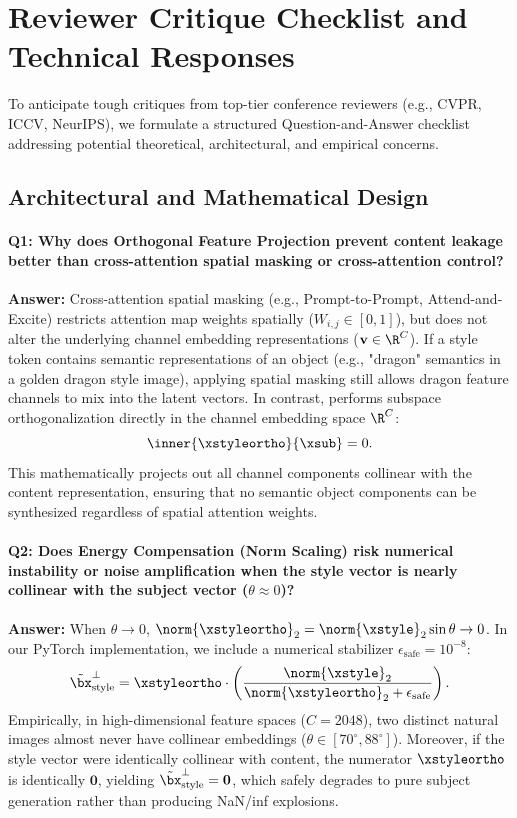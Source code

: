\section{Reviewer Critique Checklist and Technical Responses}
\label{sec:reviewer_checklist}

To anticipate tough critiques from top-tier conference reviewers (e.g., CVPR, ICCV, NeurIPS), we formulate a structured Question-and-Answer checklist addressing potential theoretical, architectural, and empirical concerns.

\subsection{Architectural and Mathematical Design}

\paragraph{Q1: Why does Orthogonal Feature Projection prevent content leakage better than cross-attention spatial masking or cross-attention control?}
\textbf{Answer:} Cross-attention spatial masking (e.g., Prompt-to-Prompt, Attend-and-Excite) restricts attention map weights spatially ($W_{i,j} \in [0, 1]$), but does not alter the underlying channel embedding representations ($\mathbf{v} \in \R^C$). If a style token contains semantic representations of an object (e.g., "dragon" semantics in a golden dragon style image), applying spatial masking still allows dragon feature channels to mix into the latent vectors. In contrast, \method performs subspace orthogonalization directly in the channel embedding space $\R^C$:
\begin{equation}
    \inner{\xstyleortho}{\xsub} = 0.
\end{equation}
This mathematically projects out all channel components collinear with the content representation, ensuring that no semantic object components can be synthesized regardless of spatial attention weights.

\paragraph{Q2: Does Energy Compensation (Norm Scaling) risk numerical instability or noise amplification when the style vector is nearly collinear with the subject vector ($\theta \approx 0$)?}
\textbf{Answer:} When $\theta \to 0$, $\norm{\xstyleortho}_2 = \norm{\xstyle}_2 \sin \theta \to 0$. In our PyTorch implementation, we include a numerical stabilizer $\epsilon_{\text{safe}} = 10^{-8}$:
\begin{equation}
    \tilde{\bx}_{\text{style}}^\perp = \xstyleortho \cdot \left( \frac{\norm{\xstyle}_2}{\norm{\xstyleortho}_2 + \epsilon_{\text{safe}}} \right).
\end{equation}
Empirically, in high-dimensional feature spaces ($C = 2048$), two distinct natural images almost never have collinear embeddings ($\theta \in [70^\circ, 88^\circ]$). Moreover, if the style vector were identically collinear with content, the numerator $\xstyleortho$ is identically $\boldsymbol{0}$, yielding $\tilde{\bx}_{\text{style}}^\perp = \boldsymbol{0}$, which safely degrades to pure subject generation rather than producing NaN/inf explosions.

